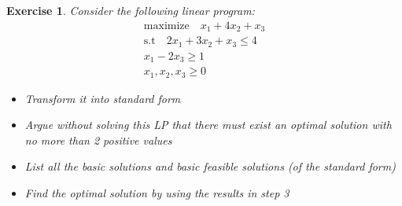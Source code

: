 \documentclass[12pt]{article}
\theoremstyle{colon}
\newtheorem{exercise}{Exercise}
\begin{document}
\begin{exercise}
  Consider the following linear program:
  \begin{gather*}
    \text{maximize} \quad x_1 + 4x_2 + x_3 \\
    \text{s.t} \quad 2x_1 + 3x_2 + x_3 \leq 4 \\
    x_1 - 2x_3 \geq 1 \\
    x_1, x_2, x_3 \geq 0
  \end{gather*}
  \begin{itemize}
      \item Transform it into standard form
      \item Argue without solving this LP that there must exist an optimal solution with no more than 2 positive values
      \item List all the basic solutions and basic feasible solutions (of the standard form)
      \item Find the optimal solution by using the results in step 3
  \end{itemize}
\end{exercise}
\end{document}
